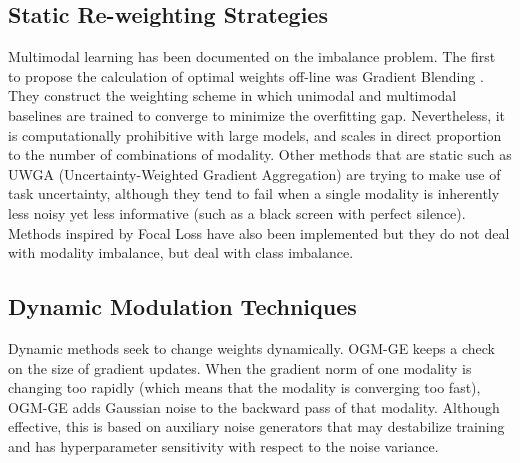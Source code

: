 \documentclass[preprint,a4paper, 10pt, 5p]{elsarticle}
\begin{document}
\subsection{Static Re-weighting Strategies}
Multimodal learning has been documented on the imbalance problem. The first to propose the calculation of optimal weights off-line was Gradient Blending \cite{wang2020makes}. They construct the weighting scheme in which unimodal and multimodal baselines are trained to converge to minimize the overfitting gap. Nevertheless, it is computationally prohibitive with large models, and scales in direct proportion to the number of combinations of modality. Other methods that are static such as UWGA (Uncertainty-Weighted Gradient Aggregation) \cite{kendall2018multi} are trying to make use of task uncertainty, although they tend to fail when a single modality is inherently less noisy yet less informative (such as a black screen with perfect silence). Methods inspired by Focal Loss \cite{lin2017focal} have also been implemented but they do not deal with modality imbalance, but deal with class imbalance.

\subsection{Dynamic Modulation Techniques}
Dynamic methods seek to change weights dynamically. OGM-GE \cite{peng2022balanced} keeps a check on the size of gradient updates. When the gradient norm of one modality is changing too rapidly (which means that the modality is converging too fast), OGM-GE adds Gaussian noise to the backward pass of that modality. Although effective, this is based on auxiliary noise generators that may destabilize training and has hyperparameter sensitivity with respect to the noise variance.
\end{document}
